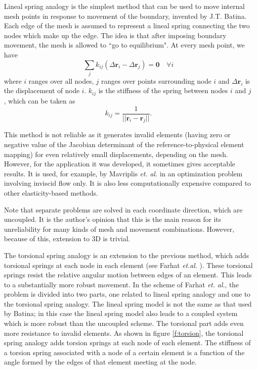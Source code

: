 \documentclass[11pt, ms, onehalfspacing]{ncsuthesis}
\begin{document}
Lineal spring analogy is the simplest method that can be used to move internal mesh points in response to movement of the boundary, invented by J.T. Batina. Each edge of the mesh is assumed to represent a lineal spring connecting the two nodes which make up the edge. The idea is that after imposing boundary movement, the mesh is allowed to ``go to equilibrium". At every mesh point, we have
\begin{equation}
\sum_j k_{ij}(\Delta \mathbf{r}_i - \Delta \mathbf{r}_j) = \mathbf{0} \quad \forall i
\end{equation}
where $i$ ranges over all nodes, $j$ ranges over points surrounding node $i$ and $\Delta \mathbf{r}_i$ is the displacement of node $i$.
$k_{ij}$ is the stiffness of the spring between nodes $i$ and $j$, which can be taken as
\begin{equation}
k_{ij} = \frac{1}{||\mathbf{r}_i - \mathbf{r}_j||}.
\end{equation}

This method is not reliable as it generates invalid elements (having zero or negative value of the Jacobian determinant of the reference-to-physical element mapping) for even relatively small displacements, depending on the mesh. However, for the application it was developed, it sometimes gives acceptable results. It is used, for example, by Mavriplis \emph{et. al.} \cite{appl:mavriplis} in an optimization problem involving inviscid flow only. It is also less computationally expensive compared to other elasticity-based methods.

Note that separate problems are solved in each coordinate direction, which are uncoupled. It is the author's opinion that this is the main reason for its unreliability for many kinds of mesh and movement combinations. However, because of this, extension to 3D is trivial.

The torsional spring analogy is an extension to the previous method, which adds torsional springs at each node in each element (see Farhat \emph{et.al.} \cite{mm:torsionsprings}).
These torsional springs resist the relative angular motion between edges of an element. This leads to a substantially more robust movement. In the scheme of Farhat \emph{et. al.}, the problem is divided into two parts, one related to lineal spring analogy and one to the torsional spring analogy. The lineal spring model is not the same as that used by Batina; in this case the lineal spring model also leads to a coupled system which is more robust than the uncoupled scheme. The torsional part adds even more resistance to invalid elements. As shown in figure \ref{f:torsion}, the torsional spring analogy adds torsion springs at each node of each element. The stiffness of a torsion spring associated with a node of a certain element is a function of the angle formed by the edges of that element meeting at the node.
\end{document}
